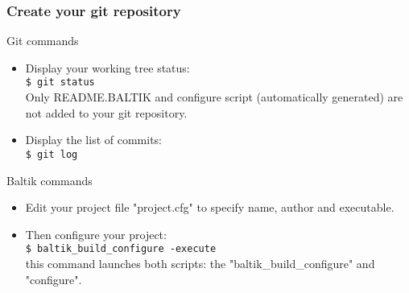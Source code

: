 \documentclass[10pt, hyperref={unicode=true,pdfusetitle, bookmarks=true,bookmarksnumbered=false,bookmarksopen=false, breaklinks=false,pdfborder={0 0 1},backref=true,colorlinks=true,linkcolor=darkblue,pageanchor, urlcolor=darkblue}]{beamer}
\begin{document}
\begin{frame}
\frametitle{Create your git repository}

\begin{alertblock}{Git commands}
\begin{itemize}
\item Display your working tree status:\\
\texttt{\$ git status}\\
Only README.BALTIK and configure script (automatically generated) are not added to your git repository.
\item Display the list of commits:\\
\texttt{\$ git log}
\end{itemize}
\end{alertblock}

\begin{block}{Baltik commands}
\begin{itemize}
\item Edit your project file "project.cfg" to specify name, author and executable.
\item Then configure your project:\\
\texttt{\$ baltik\_build\_configure -execute}\\
this command launches both scripts: the "baltik\_build\_configure" and "configure".
\end{itemize}
\end{block}

\end{frame}
\end{document}
